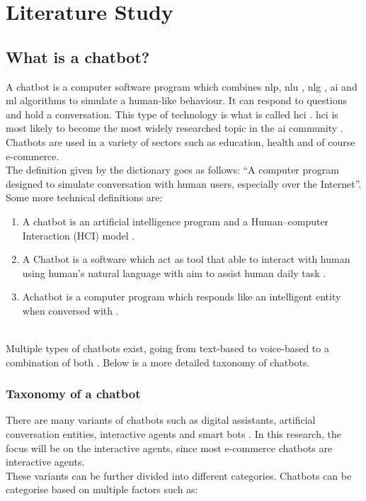 \mainmatter
\pagestyle{headings}

\chapter{Literature Study}
\label{ch:literature-study}

\section{What is a chatbot?}
A chatbot is a computer software program which combines \acrfull{nlp}, \acrfull{nlu} , \acrfull{nlg} \citep{Adamopoulou2020}, \acrfull{ai} and \acrfull{ml} algorithms to simulate a human-like behaviour. It can respond to questions and hold a conversation. This type of technology is what is called \acrfull{hci} \citep{Adamopoulou2020}.  \acrshort{hci} is most likely to become the most widely researched topic in the \acrshort{ai} community \citep{Bansal2018}. Chatbots are used in a variety of sectors such as education, health and of course e-commerce.\\
\break
The definition given by the dictionary goes as follows: “A computer program designed to simulate conversation with human users, especially over the Internet”\citep{Lexico2022}. Some more technical definitions are:
\begin{enumerate}
    \item A chatbot is an artificial intelligence program and a Human–computer Interaction (HCI) model \citep{Bansal2018}.
    \item A Chatbot is a software which act as tool that able to interact with human using human’s natural language with aim to assist human daily task \citep{Muizzah2021}.
    \item Achatbot  is  a  computer  program  which  responds  like  an  intelligent  entity when  conversed  with \citep{Khanna2015}.
\end{enumerate}\\
\break
Multiple types of chatbots exist, going from text-based to voice-based to a combination of both \citep{Radziwil2021}. Below is a more detailed taxonomy of chatbots.\\

\subsection{Taxonomy of a chatbot}
There are many variants of chatbots such as digital assistants, artificial conversation entities, interactive agents and smart bots \citep{Adamopoulou2020}. In this research, the focus will be on the interactive agents, since most e-commerce chatbots are interactive agents.\\
\break
These variants can be further divided into different categories. Chatbots can be categorise based on multiple factors such as:\\

